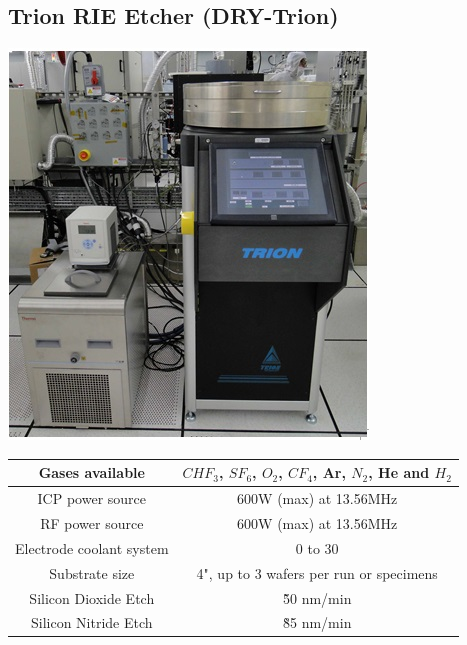 \subsection{Trion RIE Etcher (DRY-Trion)}\label{nitride_etch_machine}

\begin{minipage}[H]{\MachinePictureWidth}
	\includegraphics[width=\MachinePictureWidth]{pictures_machines/nitride_etcher.png}
\end{minipage}\begin{minipage}[H]{0.5\textwidth}
	\begin{tabular}{|c|c|}
		\hline
		Gases available &
		$CHF_3$, $SF_6$, $O_2$, $CF_4$, Ar, $N_2$, He and $H_2$ \\
		\hline
		ICP power source &
		600W (max) at 13.56MHz \\
		\hline
		RF power source &
		600W (max) at 13.56MHz \\
		\hline
		Electrode coolant system &
		0 to 30\degreesC \\
		\hline
		Substrate size &
		4", up to 3 wafers per run or specimens \\
		\hline
		Silicon Dioxide Etch &
		\~ 50 nm/min \\
		\hline
		Silicon Nitride Etch &
		\~ 85 nm/min \\
		\hline
	\end{tabular}
\end{minipage}

